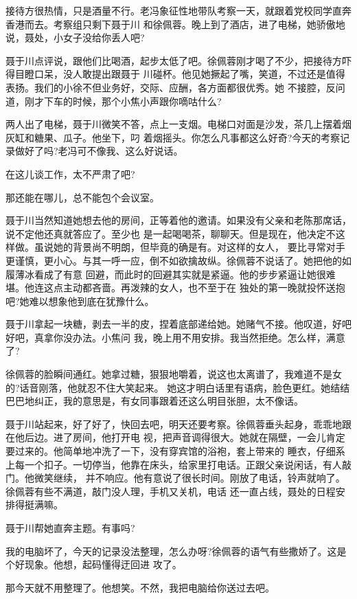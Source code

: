 \documentclass[11pt,a4paper,onecolumn]{article}
\begin{document}
接待方很热情，只是酒量不行。老冯象征性地带队考察一天，就跟着党校同学直奔香港而去。考察组只剩下聂于川
和徐佩蓉。晚上到了酒店，进了电梯，她骄傲地说，聂处，小女子没给你丢人吧?

聂于川点评说，跟他们比喝酒，起步太低了吧。徐佩蓉刚才喝了不少，把接待方吓得目瞪口呆，没人敢提出跟聂于
川碰杯。他见她撅起了嘴，笑道，不过还是值得表扬。我们的小徐不但业务好，交际、应酬，各方面都很优秀。她
不接腔，反问道，刚才下车的时候，那个小焦小声跟你嘀咕什么?

两人出了电梯，聂于川微笑不答，点上一支烟。电梯口对面是沙发，茶几上摆着烟灰缸和糖果、瓜子。他坐下，叼
着烟摇头。你怎么凡事都这么好奇?今天的考察记录做好了吗?老冯可不像我、这么好说话。

在这儿谈工作，太不严肃了吧?

那还能在哪儿，总不能包个会议室。

聂于川当然知道她想去他的房间，正等着他的邀请。如果没有父亲和老陈那席话，说不定他还真就答应了。至少也
是一起喝喝茶，聊聊天。但是现在，他决定不这样做。虽说她的背景尚不明朗，但毕竟的确是有。对这样的女人，
要比寻常对手更谨慎，更小心。与其一呼一应，倒不如欲擒故纵。徐佩蓉不说话了。她把他的如履薄冰看成了有意
回避，而此时的回避其实就是紧逼。他的步步紧逼让她很难堪。他连这点主动都吝啬。再泼辣的女人，也不至于在
独处的第一晚就投怀送抱吧?她难以想象他到底在犹豫什么。

聂于川拿起一块糖，剥去一半的皮，捏着底部递给她。她赌气不接。他叹道，好吧好吧，真拿你没办法。小焦问
我，晚上用不用安排。我当然拒绝。怎么样，满意了?

徐佩蓉的脸瞬间通红。她拿过糖，狠狠地嚼着，说这也太离谱了，我难道不是女的?话音刚落，他就忍不住大笑起来。
她这才明白话里有语病，脸色更红。她结结巴巴地纠正，我的意思是，有女同事跟着还这么明目张胆，太不像话。

聂于川站起来，好了好了，快回去吧，明天还要考察。徐佩蓉垂头起身，乖乖地跟在他后边。进了房间，他打开电
视，把声音调得很大。她就在隔壁，一会儿肯定要过来的。他简单地冲洗了一下，没有穿宾馆的浴袍，套上带来的
睡衣，仔细系上每一个扣子。一切停当，他靠在床头，给家里打电话。正跟父亲说闲话，有人敲门。他微笑继续，
并不响应。他有意说了很长时间。刚放了电话，铃声就响了。徐佩蓉有些不满道，敲门没人理，手机又关机，电话
还一直占线，聂处的日程安排得挺满嘛。

聂于川帮她直奔主题。有事吗?

我的电脑坏了，今天的记录没法整理，怎么办呀?徐佩蓉的语气有些撒娇了。这是个好现象。他想，起码懂得迂回进
攻了。

那今天就不用整理了。他想笑。不然，我把电脑给你送过去吧。
\end{document}

